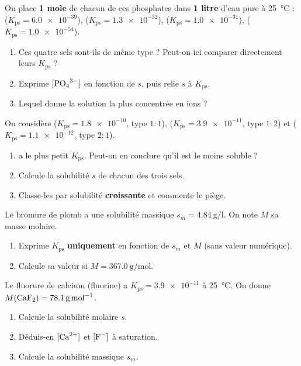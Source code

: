 \documentclass[11pt,a4paper]{article}
\begin{document}
\begin{exo}
On place \textbf{1 mole} de chacun de ces phosphates dans \textbf{1 litre} d'eau pure à
\qty{25}{\degreeCelsius} :  ($K_{\mathrm{ps}}=\num{6.0e-39}$),
 ($K_{\mathrm{ps}}=\num{1.3e-32}$),  ($K_{\mathrm{ps}}=\num{1.0e-31}$),
 ($K_{\mathrm{ps}}=\num{1.0e-54}$).
\begin{enumerate}[label=\alph*)]
  \item Ces quatre sels sont-ils de même type ? Peut-on ici comparer directement leurs
        $K_{\mathrm{ps}}$ ?
  \item Exprime $[\ce{PO4^{3-}}]$ en fonction de $s$, puis relie $s$ à $K_{\mathrm{ps}}$.
  \item Lequel donne la solution la plus concentrée en ions  ?
\end{enumerate}
\end{exo}

\begin{exo}
On considère  ($K_{\mathrm{ps}}=\num{1.8e-10}$, type $1{:}1$),
 ($K_{\mathrm{ps}}=\num{3.9e-11}$, type $1{:}2$) et
 ($K_{\mathrm{ps}}=\num{1.1e-12}$, type $2{:}1$).
\begin{enumerate}[label=\alph*)]
  \item {} a le plus petit $K_{\mathrm{ps}}$. Peut-on en conclure qu'il est le moins soluble ?
  \item Calcule la solubilité $s$ de chacun des trois sels.
  \item Classe-les par solubilité \textbf{croissante} et commente le piège.
\end{enumerate}
\end{exo}

\begin{exo}
Le bromure de plomb  a une solubilité massique $s_m=\qty{4.84}{\gram\per\litre}$. On note
$M$ sa masse molaire.
\begin{enumerate}[label=\alph*)]
  \item Exprime $K_{\mathrm{ps}}$ \textbf{uniquement} en fonction de $s_m$ et $M$ (sans valeur
        numérique).
  \item Calcule sa valeur si $M=\qty{367.0}{\gram\per\mole}$.
\end{enumerate}
\end{exo}

\begin{exo}
Le fluorure de calcium  (fluorine) a $K_{\mathrm{ps}}=\num{3.9e-11}$ à \qty{25}{\degreeCelsius}.
On donne $M(\ce{CaF2})=\qty{78.1}{\gram\per\mole}$.
\begin{enumerate}[label=\alph*)]
  \item Calcule la solubilité molaire $s$.
  \item Déduis-en $[\ce{Ca^{2+}}]$ et $[\ce{F-}]$ à saturation.
  \item Calcule la solubilité massique $s_m$.
\end{enumerate}
\end{exo}
\end{document}
